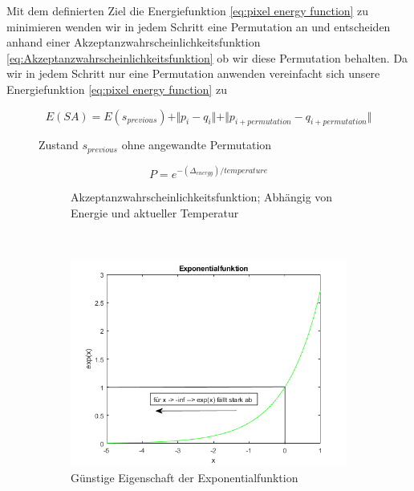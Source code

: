 Mit dem definierten Ziel die Energiefunktion \ref{eq:pixel energy function} zu minimieren wenden 
wir in jedem Schritt eine Permutation an und entscheiden anhand einer Akzeptanzwahrscheinlichkeitsfunktion
\ref{eq:Akzeptanzwahrscheinlichkeitsfunktion} ob wir diese Permutation behalten.
Da wir in jedem Schritt nur eine Permutation anwenden vereinfacht sich unsere Energiefunktion
\ref{eq:pixel energy function} zu 

\begin{figure}[H]
  \[ E(SA) = E(s_{previous}) + \Vert{p_{i}-q_{i}}\Vert + \Vert{p_{i 
        + permutation}-q_{i + permutation}}\Vert\]
  \caption{Zustand $s_{previous}$ ohne angewandte Permutation}
  \label{eq:vereinfachte pixel energy function}
\end{figure}


\begin{figure}[H]
    \centering
    \begin{subfigure}[b]{0.4\textwidth}
        \begin{equation}\label{eq:Akzeptanzwahrscheinlichkeitsfunktion}
            P = e^{-(\Delta_{energy})/ temperature}
        \end{equation}
        \caption{Akzeptanzwahrscheinlichkeitsfunktion; Abhängig von Energie und aktueller Temperatur}
    \end{subfigure}
    ~ %
    \begin{subfigure}[b]{0.7\textwidth}
        \centering \includegraphics[interpolate=false,width=\linewidth]{content/simulatedAnnealing/Bilder/exponentialfunktion_as_PDF.png}
        \caption{Günstige Eigenschaft der Exponentialfunktion}
        \label{fig:Exponentialfunktion}
    \end{subfigure}
    \caption{}
\end{figure}

